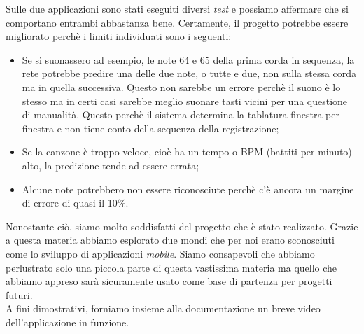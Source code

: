 Sulle due applicazioni sono stati eseguiti diversi \textit{test} e possiamo affermare che si comportano entrambi abbastanza bene. Certamente, il progetto potrebbe essere migliorato perchè i limiti individuati sono i seguenti:
\begin{itemize}
		\item Se si suonassero ad esempio, le note 64 e 65 della prima corda in sequenza, la rete potrebbe predire una delle due note, o tutte e due, non sulla stessa corda ma in quella successiva. Questo non sarebbe un errore perchè il suono è lo stesso ma in certi casi sarebbe meglio suonare tasti vicini per una questione di manualità. Questo perchè il sistema determina la tablatura finestra per finestra e non tiene conto della sequenza della registrazione;
		\item Se la canzone è troppo veloce, cioè ha un tempo o BPM (battiti per minuto) alto, la predizione tende ad essere errata;
		\item Alcune note potrebbero non essere riconosciute perchè c'è ancora un margine di errore di quasi il 10\%.
	\end{itemize}
Nonostante ciò, siamo molto soddisfatti del progetto che è stato realizzato. Grazie a questa materia abbiamo esplorato due mondi che per noi erano sconosciuti come lo sviluppo di applicazioni \textit{mobile}. Siamo consapevoli che abbiamo perlustrato solo una piccola parte di questa vastissima materia ma quello che abbiamo appreso sarà sicuramente usato come base di partenza per progetti futuri.\\
\newline
A fini dimostrativi, forniamo insieme alla documentazione un breve video dell'applicazione in funzione.